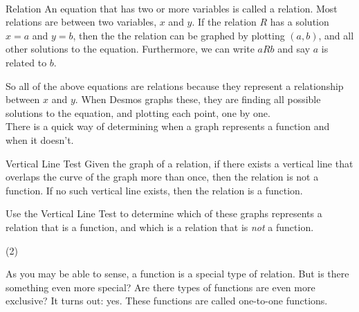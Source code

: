 \documentclass[12pt,fleqn]{book}
\begin{document}
\\[1em]
\begin{defn}{Relation}{}
    An equation that has two or more variables is called a relation.  Most relations are between two variables, $x$ and $y$.  If the relation $R$ has a solution $x=a$ and $y=b$, then the the relation can be graphed by plotting $(a,b)$, and all other solutions to the equation.  Furthermore, we can write $a R b$ and say $a$ is related to $b$.
\end{defn}
So all of the above equations are relations because they represent a relationship between $x$ and $y$.  When Desmos graphs these, they are finding all possible solutions to the equation, and plotting each point, one by one.
\\[1em]
There is a quick way of determining when a graph represents a function and when it doesn't.  
\begin{defn}{Vertical Line Test}{}
Given the graph of a relation, if there exists a vertical line that overlaps the curve of the graph more than once, then the relation is not a function.  If no such vertical line exists, then the relation is a function.
\end{defn}
Use the Vertical Line Test to determine which of these graphs represents a relation that is a function, and which is a relation that is \emph{not} a function.
\begin{tasks}(2)
\task {}
\task {}
\task {}
\task {}
\task {}
\task {}
\task {}
\task {}
\end{tasks}

As you may be able to sense, a function is a special type of relation.  But is there something even more special?  Are there types of functions are even more exclusive?  It turns out: yes.  These functions are called one-to-one functions.
\end{document}
